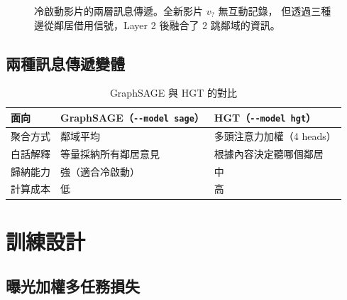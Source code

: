 \documentclass[12pt, a4paper]{article}
\begin{document}
\begin{figure}[H]
\caption{冷啟動影片的兩層訊息傳遞。全新影片 $v_?$ 無互動記錄，
但透過三種邊從鄰居借用信號，Layer 2 後融合了 2 跳鄰域的資訊。}
\end{figure}

\subsection{兩種訊息傳遞變體}

\begin{table}[H]
\centering
\caption{GraphSAGE 與 HGT 的對比}
\begin{tabular}{lll}
\toprule
\textbf{面向} & \textbf{GraphSAGE（\texttt{-{}-model sage}）} & \textbf{HGT（\texttt{-{}-model hgt}）} \\
\midrule
聚合方式 & 鄰域平均 & 多頭注意力加權（4 heads）\\
白話解釋 & 等量採納所有鄰居意見 & 根據內容決定聽哪個鄰居 \\
歸納能力 & 強（適合冷啟動） & 中 \\
計算成本 & 低 & 高 \\
\bottomrule
\end{tabular}
\end{table}

\section{訓練設計}
\label{sec:training}

\subsection{曝光加權多任務損失}
\end{document}
